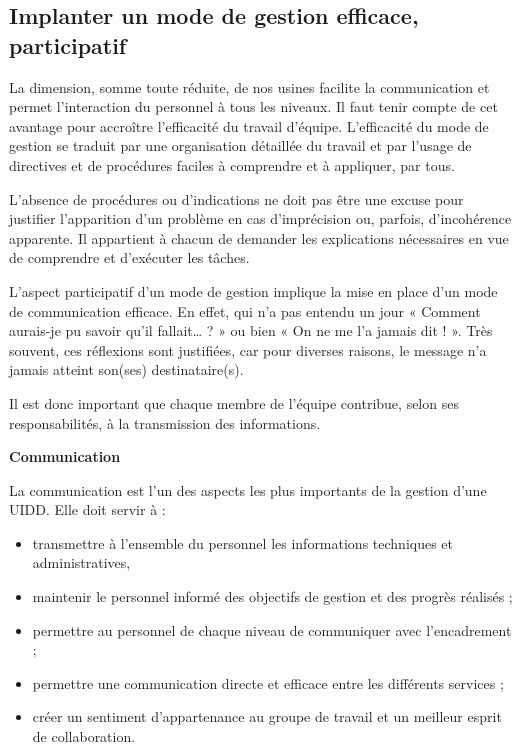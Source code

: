  
 \subsection{Implanter un mode de gestion efficace, participatif}

La dimension, somme toute réduite, de nos usines facilite la communication et permet l’interaction du personnel à tous les niveaux. Il faut tenir compte de cet avantage pour accroître l’efficacité du travail d’équipe.
L’efficacité du mode de gestion se traduit par une organisation détaillée du travail et par l’usage de directives et de procédures faciles à comprendre et à appliquer, par tous.
\vspace{0.3cm} 


L’absence de procédures ou d’indications ne doit pas être une excuse pour justifier l’apparition d’un problème en cas d’imprécision ou, parfois, d’incohérence apparente. Il appartient à chacun de demander les explications nécessaires en vue de comprendre et d’exécuter les tâches.

\vspace{0.3cm} 

L’aspect participatif d’un mode de gestion implique la mise en place d’un mode de communication efficace. En effet, qui n’a pas entendu un jour « Comment aurais-je pu savoir qu’il fallait… ? » ou bien « On ne me l’a jamais dit ! ». Très souvent, ces réflexions sont justifiées, car pour diverses raisons, le message n’a jamais atteint son(ses) destinataire(s).
\vspace{0.3cm} 

Il est donc important que chaque membre de l’équipe contribue, selon ses responsabilités, à la transmission des informations.


\vspace{0.3cm}

\textbf{	Communication }
\vspace{0.3cm} 

La communication est l’un des aspects les plus importants de la gestion d’une UIDD. Elle doit servir à :
\begin{itemize}

\item transmettre à l’ensemble du personnel les informations techniques et administratives,
\item maintenir le personnel informé des objectifs de gestion et des progrès réalisés ;
\item permettre au personnel de chaque niveau de communiquer avec l’encadrement ;
\item permettre une communication directe et efficace entre les différents services ;
\item créer un sentiment d’appartenance au groupe de travail et un meilleur esprit de collaboration.


\end{itemize}


